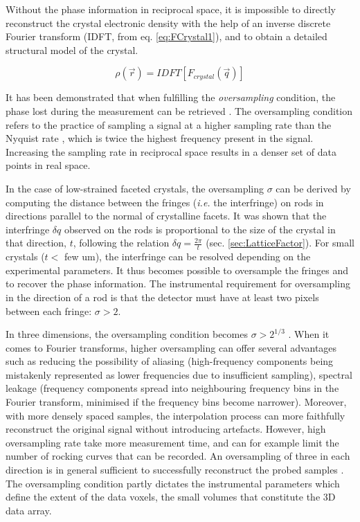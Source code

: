 Without the phase information in reciprocal space, it is impossible to directly reconstruct the crystal electronic density with the help of an inverse discrete Fourier transform (IDFT, from eq. \ref{eq:FCrystal1}), and to obtain a detailed structural model of the crystal.

\begin{equation}
    \label{eq:IDFT}
    \rho(\vec{r}) = IDFT [F_{crystal}(\vec{q})]
\end{equation}

It has been demonstrated that when fulfilling the \textit{oversampling} condition, the phase lost during the measurement can be retrieved \parencite{Shannon1949, Sayre1952}.
The oversampling condition refers to the practice of sampling a signal at a higher sampling rate than the Nyquist rate \parencite{Miao2000}, which is twice the highest frequency present in the signal.
Increasing the sampling rate in reciprocal space results in a denser set of data points in real space.

In the case of low-strained faceted crystals, the oversampling $\sigma$ can be derived by computing the distance between the fringes (\textit{i.e.} the interfringe) on rods in directions parallel to the normal of crystalline facets.
It was shown that the interfringe $\delta q$ observed on the rods is proportional to the size of the crystal in that direction, $t$, following the relation $\delta q = \frac{2\pi}{t}$ (sec. \ref{sec:LatticeFactor}).
For small crystals ($t<$ few \unit{um}), the interfringe can be resolved depending on the experimental parameters.
It thus becomes possible to oversample the fringes and to recover the phase information.
The instrumental requirement for oversampling in the direction of a rod is that the detector must have at least two pixels between each fringe: $\sigma >2$.

In three dimensions, the oversampling condition becomes $\sigma>2^{1/3}$ \parencite{Miao1998, Miao2000, Miao2000a}.
When it comes to Fourier transforms, higher oversampling can offer several advantages such as reducing the possibility of aliasing (high-frequency components being mistakenly represented as lower frequencies due to insufficient sampling), spectral leakage (frequency components spread into neighbouring frequency bins in the Fourier transform, minimised if the frequency bins become narrower).
Moreover, with more densely spaced samples, the interpolation process can more faithfully reconstruct the original signal without introducing artefacts.
However, high oversampling rate take more measurement time, and can for example limit the number of rocking curves that can be recorded.
An oversampling of three in each direction is in general sufficient to successfully reconstruct the probed samples \parencite{Dupraz2015}.
The oversampling condition partly dictates the instrumental parameters which define the extent of the data voxels, the small volumes that constitute the 3D data array.

